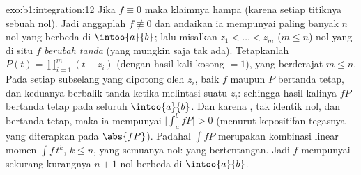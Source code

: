 \begin{solution}{exo:b1:integration:12}
Jika $f \equiv 0$ maka klaimnya hampa (karena setiap titiknya sebuah nol). Jadi
anggaplah $f \not\equiv 0$ dan andaikan ia mempunyai paling banyak $n$ nol
yang berbeda di $\intoo{a}{b}$; lalu misalkan $z_1 < \dots < z_m$ ($m \leq n$)
nol yang di situ $f$ \emph{berubah tanda} (yang mungkin saja tak ada). Tetapkanlah
$P(t) = \prod_{i=1}^{m}(t - z_i)$ (dengan hasil kali kosong $= 1$), yang
berderajat $m \leq n$. Pada setiap subselang yang dipotong oleh $z_i$, baik
$f$ maupun $P$ bertanda tetap, dan keduanya berbalik tanda ketika melintasi
suatu $z_i$: sehingga hasil kalinya $fP$ bertanda tetap pada seluruh
$\intoo{a}{b}$. Dan karena , tak identik nol, dan
bertanda tetap, maka ia mempunyai $\bigl|\int_a^b fP\bigr| > 0$ (menurut kepositifan
tegasnya yang diterapkan pada $\abs{fP}$). Padahal $\int f P$ merupakan kombinasi
linear momen $\int f\,t^k$, $k \leq n$, yang semuanya nol:
yang bertentangan. Jadi $f$ mempunyai sekurang-kurangnya $n + 1$ nol berbeda di
$\intoo{a}{b}$.
\end{solution}

